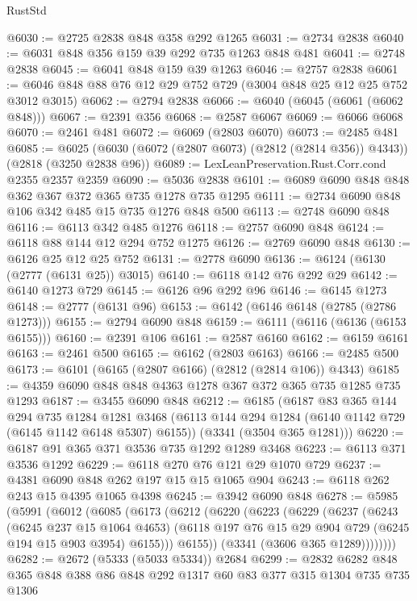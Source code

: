 \begin{lexlean}{RustStd}
\begin{coremodule}
@6030 := @2725 @2838 @848 @358 @292 @1265
@6031 := @2734 @2838
@6040 := @6031 @848 @356 @159 @39 @292 @735 @1263 @848 @481
@6041 := @2748 @2838
@6045 := @6041 @848 @159 @39 @1263
@6046 := @2757 @2838
@6061 := @6046 @848 @88 @76 @12 @29 @752 @729 (@3004 @848 @25 @12 @25 @752 @3012 @3015)
@6062 := @2794 @2838
@6066 := @6040 (@6045 (@6061 (@6062 @848)))
@6067 := @2391 @356
@6068 := @2587 @6067
@6069 := @6066 @6068
@6070 := @2461 @481
@6072 := @6069 (@2803 @6070)
@6073 := @2485 @481
@6085 := @6025 (@6030 (@6072 (@2807 @6073) (@2812 (@2814 @356)) @4343)) (@2818 (@3250 @2838 @96))
@6089 := LexLeanPreservation.Rust.Corr.cond @2355 @2357 @2359
@6090 := @5036 @2838
@6101 := @6089 @6090 @848 @848 @362 @367 @372 @365 @735 @1278 @735 @1295
@6111 := @2734 @6090 @848 @106 @342 @485 @15 @735 @1276 @848 @500
@6113 := @2748 @6090 @848
@6116 := @6113 @342 @485 @1276
@6118 := @2757 @6090 @848
@6124 := @6118 @88 @144 @12 @294 @752 @1275
@6126 := @2769 @6090 @848
@6130 := @6126 @25 @12 @25 @752
@6131 := @2778 @6090
@6136 := @6124 (@6130 (@2777 (@6131 @25)) @3015)
@6140 := @6118 @142 @76 @292 @29
@6142 := @6140 @1273 @729
@6145 := @6126 @96 @292 @96
@6146 := @6145 @1273
@6148 := @2777 (@6131 @96)
@6153 := @6142 (@6146 @6148 (@2785 (@2786 @1273)))
@6155 := @2794 @6090 @848
@6159 := @6111 (@6116 (@6136 (@6153 @6155)))
@6160 := @2391 @106
@6161 := @2587 @6160
@6162 := @6159 @6161
@6163 := @2461 @500
@6165 := @6162 (@2803 @6163)
@6166 := @2485 @500
@6173 := @6101 (@6165 (@2807 @6166) (@2812 (@2814 @106)) @4343)
@6185 := @4359 @6090 @848 @848 @4363 @1278 @367 @372 @365 @735 @1285 @735 @1293
@6187 := @3455 @6090 @848
@6212 := @6185
    (@6187
      @83
      @365
      @144
      @294
      @735
      @1284
      @1281
      @3468
      (@6113 @144 @294 @1284 (@6140 @1142 @729 (@6145 @1142 @6148 @5307) @6155))
      (@3341 (@3504 @365 @1281)))
@6220 := @6187 @91 @365 @371 @3536 @735 @1292 @1289 @3468
@6223 := @6113 @371 @3536 @1292
@6229 := @6118 @270 @76 @121 @29 @1070 @729
@6237 := @4381 @6090 @848 @262 @197 @15 @15 @1065 @904
@6243 := @6118 @262 @243 @15 @4395 @1065 @4398
@6245 := @3942 @6090 @848
@6278 := @5985
    (@5991
      (@6012
        (@6085
          (@6173
            (@6212
              (@6220
                (@6223
                  (@6229
                    (@6237
                      (@6243
                        (@6245 @237 @15 @1064 @4653)
                        (@6118 @197 @76 @15 @29 @904 @729 (@6245 @194 @15 @903 @3954) @6155)))
                    @6155))
                (@3341 (@3606 @365 @1289))))))))
@6282 := @2672 (@5333 (@5033 @5334)) @2684
@6299 := @2832 @6282 @848 @365 @848 @388 @86 @848 @292 @1317 @60 @83 @377 @315 @1304 @735 @735 @1306

\end{coremodule}
\end{lexlean}
